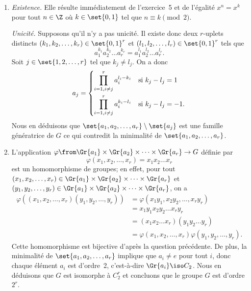 \begin{enumerate}
  \item
    \emph{Existence.}
    Elle résulte immédiatement de l'exercice~5 et de l'égalité $x^n = x^k$ pour tout $n\in\Z$ où $k\in\set{0,1}$ tel que $n\equiv k\pmod{2}$.

    \emph{Unicité.}
    Supposons qu'il n'y a pas unicité.
    Il existe donc deux $r$-uplets distincts $(k_1,k_2,\dots,k_r)\in\set{0,1}^r$ et $(l_1,l_2,\dots,l_r)\in\set{0,1}^r$ tels que
    \[
      a_1^{k_1} a_2^{k_2} \dots a_r^{k_r} = a_1^{l_1} a_2^{l_2} \dots a_r^{l_r}.
    \]
    Soit $j\in\set{1,2,\dots,r}$ tel que $k_j\neq l_j$.
    On a donc
    \[
      a_j =
        \begin{dcases}
          \prod_{i=1,i\neq j}^r a_i^{l_i - k_i} & \text{si $k_j - l_j = 1$} \\
          \prod_{i=1,i\neq j}^r a_i^{k_i - l_i} & \text{si $k_j - l_j = -1$}.
        \end{dcases}
    \]
    Nous en déduisons que $\set{a_1,a_2,\dots,a_r}\setminus\set{a_j}$ est une famille génératrice de $G$ ce qui contredit la minimalité de $\set{a_1,a_2,\dots,a_r}$.

  \item
     L'application $\varphi\from\Gr{a_1}\times\Gr{a_2}\times\dots\times\Gr{a_r}\to G$ définie par
     \[
       \varphi(x_1,x_2,\dots,x_r) = x_1x_2\dots x_r
     \]
     est un homomorphisme de groupes; en effet, pour tout $(x_1,x_2,\dots,x_r)\in\Gr{a_1}\times\Gr{a_2}\times\dots\times\Gr{a_r}$ et $(y_1,y_2,\dots,y_r)\in\Gr{a_1}\times\Gr{a_2}\times\dots\times\Gr{a_r}$, on a
     \begin{align*}
       \varphi((x_1,x_2,\dots,x_r)(y_1,y_2,\dots,y_r))
       &= \varphi(x_1y_1,x_2y_2,\dots,x_ry_r) \\
       &= x_1y_1x_2y_2\dots x_ry_r \\
       &= (x_1x_2\dots x_r)(y_1y_2\dots y_r) \\
       &= \varphi(x_1,x_2,\dots,x_r)\varphi(y_1,y_2,\dots,y_r).
     \end{align*}
     Cette homomorphisme est bijective d'après la question précédente.
     De plus, la minimalité de $\set{a_1,a_2,\dots,a_r}$ implique que $a_i \neq e$ pour tout $i$, donc chaque élément $a_i$ est d'ordre~2, c'est-à-dire $\Gr{a_i}\iso C_2$.
     Nous en déduisons que $G$ est isomorphe à $C_2^r$ et concluons que le groupe $G$ est d'ordre $2^r$.
\end{enumerate}
